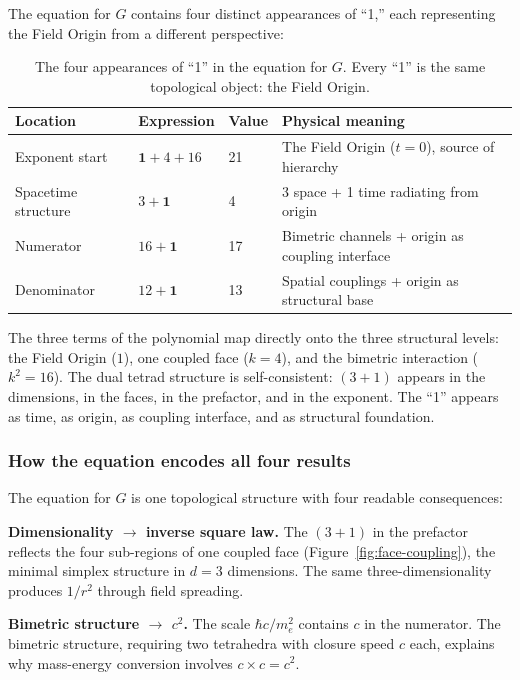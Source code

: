 \documentclass[aps,prd,preprint,superscriptaddress,showpacs,preprintnumbers,amsmath,amssymb,nofootinbib]{revtex4-2}
\begin{document}
The equation for $G$ contains four distinct appearances of ``1,'' each representing the Field Origin from a different perspective:

\begin{table}[H]
\centering
\begin{tabular*}{\textwidth}{@{\extracolsep{\fill}} llll @{}}
\toprule
\textbf{Location} & \textbf{Expression} & \textbf{Value} & \textbf{Physical meaning} \\
\midrule
Exponent start & $\mathbf{1} + 4 + 16$ & 21 & The Field Origin ($t = 0$), source of hierarchy \\
Spacetime structure & $3 + \mathbf{1}$ & 4 & 3 space + 1 time radiating from origin \\
Numerator & $16 + \mathbf{1}$ & 17 & Bimetric channels + origin as coupling interface \\
Denominator & $12 + \mathbf{1}$ & 13 & Spatial couplings + origin as structural base \\
\bottomrule
\end{tabular*}
\caption{The four appearances of ``1'' in the equation for $G$. Every ``1'' is the same topological object: the Field Origin.}
\label{tab:ones}
\end{table}

The three terms of the polynomial map directly onto the three structural levels: the Field Origin ($1$), one coupled face ($k = 4$), and the bimetric interaction ($k^2 = 16$). The dual tetrad structure is self-consistent: $(3{+}1)$ appears in the dimensions, in the faces, in the prefactor, and in the exponent. The ``1'' appears as time, as origin, as coupling interface, and as structural foundation.

\subsubsection*{How the equation encodes all four results}

The equation for $G$ is one topological structure with four readable consequences:

\textbf{Dimensionality $\rightarrow$ inverse square law.} The $(3+1)$ in the prefactor reflects the four sub-regions of one coupled face (Figure~\ref{fig:face-coupling}), the minimal simplex structure in $d = 3$ dimensions. The same three-dimensionality produces $1/r^2$ through field spreading.

\textbf{Bimetric structure $\rightarrow$ $c^2$.} The scale $\hbar c/m_e^2$ contains $c$ in the numerator. The bimetric structure, requiring two tetrahedra with closure speed $c$ each, explains why mass-energy conversion involves $c \times c = c^2$.
\end{document}
